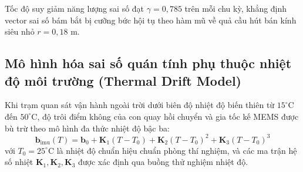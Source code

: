\begin{table}[H]
\centering
\caption{Các chỉ số hội tụ ổn định Lyapunov của các giải thuật bám bắt mục tiêu}
\label{tab:lyapunov-stability-metrics-table}
\end{table}

Tốc độ suy giảm năng lượng sai số đạt $\gamma = 0{,}785$ trên mỗi chu kỳ, khẳng định vector sai số bám bắt bị cưỡng bức hội tụ theo hàm mũ về quả cầu hút bán kính siêu nhỏ $r = 0{,}18$ m.

\subsection{Mô hình hóa sai số quán tính phụ thuộc nhiệt độ môi trường (Thermal Drift Model)}

\hspace{0.5cm} Khi trạm quan sát vận hành ngoài trời dưới biên độ nhiệt độ biến thiên từ $15^\circ\text{C}$ đến $50^\circ\text{C}$, độ trôi điểm không của con quay hồi chuyển và gia tốc kế MEMS được bù trừ theo mô hình đa thức nhiệt độ bậc ba:
\begin{equation}
\mathbf{b}_{\text{imu}}(T) = \mathbf{b}_0 + \mathbf{K}_1 (T - T_0) + \mathbf{K}_2 (T - T_0)^2 + \mathbf{K}_3 (T - T_0)^3
\label{eq:imu-thermal-drift-polynomial}
\end{equation}
với $T_0 = 25^\circ\text{C}$ là nhiệt độ chuẩn hiệu chuẩn phòng thí nghiệm, và các ma trận hệ số nhiệt $\mathbf{K}_1, \mathbf{K}_2, \mathbf{K}_3$ được xác định qua buồng thử nghiệm nhiệt độ.

